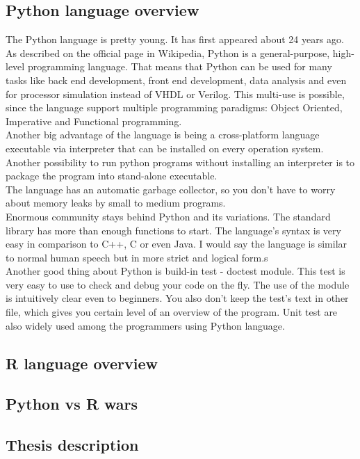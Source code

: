 \documentclass{article}
\begin{document}
\subsection{Python language overview}
The Python language is pretty young. It has first appeared about 24 years ago. As described on the official page in Wikipedia, Python is a general-purpose, high-level programming language. That means that Python can be used for many tasks like back end development, front end development, data analysis and even for processor simulation instead of VHDL or Verilog. This multi-use is possible, since the language support multiple programming paradigms: Object Oriented, Imperative and Functional programming.\\
Another big advantage of the language is being a cross-platform language executable via interpreter that can be installed on every operation system. Another possibility to run python programs without installing an interpreter is to package the program into stand-alone executable.\\ 
The language has an automatic garbage collector, so you don't have to worry about memory leaks by small to medium programs.\\
Enormous community stays behind Python and its variations. The standard library has more than enough functions to start. The language's syntax is very easy in comparison to C++, C or even Java. I would say the language is similar to normal human speech but in more strict and logical form.s\\
Another good thing about Python is build-in test - doctest module. This test is very easy to use to check and debug your code on the fly. The use of the module is intuitively clear even to beginners. You also don't keep the test's text in other file, which gives you certain level of an overview of the program. Unit test are also widely used among the programmers using Python language. 
\subsection{R language overview}

\subsection{Python vs R wars}

\subsection{Thesis description}
\end{document}
